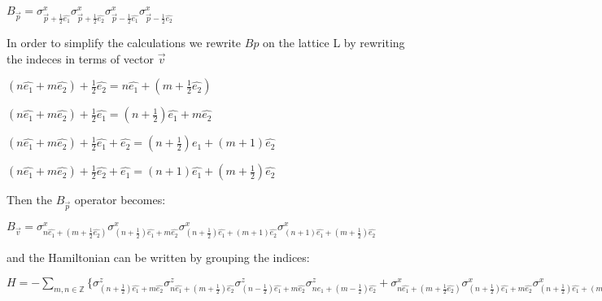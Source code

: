 \documentclass[12pt]{report}
\begin{document}
\begin{minipage}{1\textwidth}
\begin{center}
    		$B_{\vec{p}} = \sigma^x_{\vec{p}+\frac{1}{2}\hat{e_1}} \sigma^x_{\vec{p}+\frac{1}{2}\hat{e_2}} \sigma^x_{\vec{p}-\frac{1}{2}\hat{e_1}} \sigma^x_{\vec{p}-\frac{1}{2}\hat{e_2}}$\newline
    	
    	\end{center}
    	
    	In order to simplify the calculations we rewrite $Bp$ on the lattice L by rewriting the indeces in terms of vector $\vec{v}$
    	
    	\begin{center}
    		$(n\hat{e_1} + m\hat{e_2}) + \frac{1}{2}\hat{e_2}= n\hat{e_1} + (m+\frac{1}{2}\hat{e_2})$\newline
    		
    		$(n\hat{e_1} + m\hat{e_2}) + \frac{1}{2}\hat{e_1}= (n+ \frac{1}{2})\hat{e_1} + m\hat{e_2}$\newline
    		
    		$(n\hat{e_1} + m\hat{e_2}) + \frac{1}{2}\hat{e_1}+\hat{e_2}= (n+ \frac{1}{2})\hat{e_1} + (m + 1)\hat{e_2}$\newline
    		
    		$(n\hat{e_1} + m\hat{e_2}) + \frac{1}{2}\hat{e_2}+\hat{e_1}= (n+ 1)\hat{e_1} + (m + \frac{1}{2})\hat{e_2}$\newline
    	\end{center}
    	
    	Then the $B_{\vec{p}}$ operator becomes:
    	
    	\begin{center}
    		
    		$B_{\vec{v}} = \sigma^x_{n\hat{e_1} + (m+\frac{1}{2}\hat{e_2})} \sigma^x_{(n+ \frac{1}{2})\hat{e_1} + m\hat{e_2}} \sigma^x_{(n+ \frac{1}{2})\hat{e_1} + (m + 1)\hat{e_2}} \sigma^x_{(n+ 1)\hat{e_1} + (m + \frac{1}{2})\hat{e_2}}$\newline
    		
    	\end{center}
    	
    	and the Hamiltonian can be written by grouping the indices:\newline
    	
    	\begin{center}
    	
    	$H = - \sum_{m,n \in \mathbb{Z}} \{ 
    	\sigma^z_{(n+\frac{1}{2})\hat{e_1} + m\hat{e_2}} \sigma^z_{n\hat{e_1}+(m+\frac{1}{2})\hat{e_2}} \sigma^z_{(n-\frac{1}{2})\hat{e_1} + m\hat{e_2}} \sigma^z_{n\hat{e_1}+(m-\frac{1}{2})\hat{e_2}} +
    	\sigma^x_{n\hat{e_1} + (m+\frac{1}{2}\hat{e_2})} \sigma^x_{(n+ \frac{1}{2})\hat{e_1} + m\hat{e_2}} \sigma^x_{(n+ \frac{1}{2})\hat{e_1} + (m + 1)\hat{e_2}} \sigma^x_{(n+ 1)\hat{e_1} + (m + \frac{1}{2})\hat{e_2}} \} $
    	
       \end{center}
    	
	
    \end{minipage}
	
\end{document}
